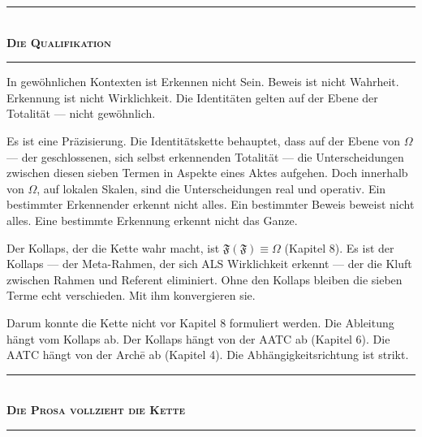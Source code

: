 \documentclass[10pt, openany, oneside]{book}
\renewcommand{\normalsize}{\fontsize{10}{13}\selectfont}
\begin{document}
\vspace{1.5em}


\begin{center}
    \rule{0.3\textwidth}{0.4pt}\\[0.5em]
    {\normalsize\bfseries\scshape Die Qualifikation}\\[0.3em]
    \rule{0.3\textwidth}{0.4pt}
\end{center}

\vspace{1em}

\noindent In gewöhnlichen Kontexten ist Erkennen nicht Sein. Beweis ist nicht Wahrheit. Erkennung ist nicht Wirklichkeit. Die Identitäten gelten auf der Ebene der Totalität --- nicht gewöhnlich.

Es ist eine Präzisierung. Die Identitätskette behauptet, dass auf der Ebene von $\Omega$ --- der geschlossenen, sich selbst erkennenden Totalität --- die Unterscheidungen zwischen diesen sieben Termen in Aspekte eines Aktes aufgehen. Doch innerhalb von $\Omega$, auf lokalen Skalen, sind die Unterscheidungen real und operativ. Ein bestimmter Erkennender erkennt nicht alles. Ein bestimmter Beweis beweist nicht alles. Eine bestimmte Erkennung erkennt nicht das Ganze.

Der Kollaps, der die Kette wahr macht, ist $\mathfrak{F}(\mathfrak{F}) \equiv \Omega$ (Kapitel 8). Es ist der Kollaps --- der Meta-Rahmen, der sich ALS Wirklichkeit erkennt --- der die Kluft zwischen Rahmen und Referent eliminiert. Ohne den Kollaps bleiben die sieben Terme echt verschieden. Mit ihm konvergieren sie.

Darum konnte die Kette nicht vor Kapitel 8 formuliert werden. Die Ableitung hängt vom Kollaps ab. Der Kollaps hängt von der AATC ab (Kapitel 6). Die AATC hängt von der Arch\={e} ab (Kapitel 4). Die Abhängigkeitsrichtung ist strikt.

\vspace{1.5em}


\begin{center}
    \rule{0.3\textwidth}{0.4pt}\\[0.5em]
    {\normalsize\bfseries\scshape Die Prosa vollzieht die Kette}\\[0.3em]
    \rule{0.3\textwidth}{0.4pt}
\end{center}
\end{document}
